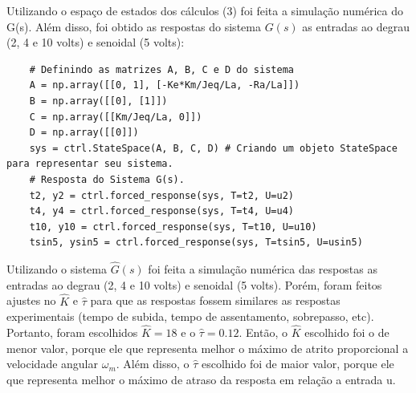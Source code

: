 \documentclass[10pt]{article}
\begin{document}
\quad Utilizando o espaço de estados dos cálculos (3) foi feita a simulação numérica do G(s).
Além disso, foi obtido as respostas do sistema $G(s)$ as entradas ao degrau (2, 4 e 10 volts) e
senoidal (5 volts):

\begin{verbatim}
    # Definindo as matrizes A, B, C e D do sistema
    A = np.array([[0, 1], [-Ke*Km/Jeq/La, -Ra/La]])
    B = np.array([[0], [1]])
    C = np.array([[Km/Jeq/La, 0]])
    D = np.array([[0]])
    sys = ctrl.StateSpace(A, B, C, D) # Criando um objeto StateSpace para representar seu sistema.
    # Resposta do Sistema G(s).
    t2, y2 = ctrl.forced_response(sys, T=t2, U=u2)
    t4, y4 = ctrl.forced_response(sys, T=t4, U=u4)
    t10, y10 = ctrl.forced_response(sys, T=t10, U=u10)
    tsin5, ysin5 = ctrl.forced_response(sys, T=tsin5, U=usin5)
\end{verbatim}

\quad Utilizando o sistema $\hat{G}(s)$ foi feita a simulação numérica das respostas
as entradas ao degrau (2, 4 e 10 volts) e senoidal (5 volts).
Porém, foram feitos ajustes no $\hat{K}$ e $\hat{\tau}$ para que as respostas fossem similares as respostas experimentais (tempo de
subida, tempo de assentamento, sobrepasso, etc). Portanto, foram escolhidos $\hat{K} = 18$ e o $\hat{\tau} = 0.12$.
Então, o $\hat{K}$ escolhido foi o de menor valor, porque ele que representa melhor o máximo de atrito proporcional a velocidade angular $\omega_m$.
Além disso, o $\hat{\tau}$ escolhido foi de maior valor, porque ele que representa melhor o máximo de atraso da resposta em relação a entrada u.
\end{document}
